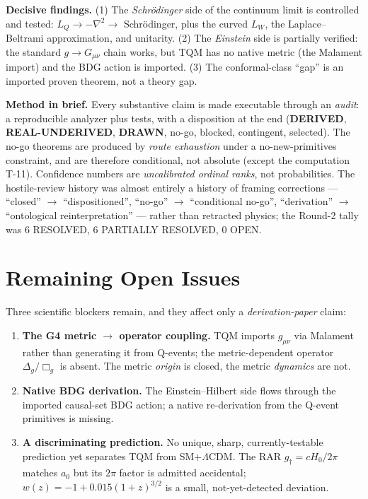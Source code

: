 \documentclass[10pt,a4paper]{article}
\newcommand{\derived}{\textbf{DERIVED}}
\newcommand{\realunder}{\textbf{REAL-UNDERIVED}}
\newcommand{\drawn}{\textbf{DRAWN}}
\begin{document}
\textbf{Decisive findings.} (1) The \emph{Schr\"odinger} side of the continuum limit is
controlled and tested: $L_Q\to-\nabla^2\to$ Schr\"odinger, plus the curved $L_W$, the
Laplace--Beltrami approximation, and unitarity. (2) The \emph{Einstein} side is partially
verified: the standard $g\to G_{\mu\nu}$ chain works, but TQM has no native metric (the
Malament import) and the BDG action is imported. (3) The conformal-class ``gap'' is an
imported proven theorem, not a theory gap.

\textbf{Method in brief.} Every substantive claim is made executable through an
\emph{audit}: a reproducible analyzer plus tests, with a disposition at the end
(\derived, \realunder, \drawn, no-go, blocked, contingent, selected). The no-go theorems
are produced by \emph{route exhaustion} under a no-new-primitives constraint, and are
therefore conditional, not absolute (except the computation T-11). Confidence numbers are
\emph{uncalibrated ordinal ranks}, not probabilities. The hostile-review history was almost
entirely a history of framing corrections --- ``closed'' $\to$ ``dispositioned'',
``no-go'' $\to$ ``conditional no-go'', ``derivation'' $\to$ ``ontological
reinterpretation'' --- rather than retracted physics; the Round-2 tally was 6 RESOLVED,
6 PARTIALLY RESOLVED, 0 OPEN.

\section{Remaining Open Issues}

Three scientific blockers remain, and they affect only a \emph{derivation-paper} claim:

\begin{enumerate}
\item \textbf{The G4 metric $\to$ operator coupling.} TQM imports $g_{\mu\nu}$ via
Malament rather than generating it from Q-events; the metric-dependent operator
$\Delta_g/\Box_g$ is absent. The metric \emph{origin} is closed, the metric
\emph{dynamics} are not.
\item \textbf{Native BDG derivation.} The Einstein--Hilbert side flows through the
imported causal-set BDG action; a native re-derivation from the Q-event primitives is
missing.
\item \textbf{A discriminating prediction.} No unique, sharp, currently-testable prediction
yet separates TQM from SM$+\Lambda$CDM. The RAR $g_\dagger=cH_0/2\pi$ matches $a_0$ but its
$2\pi$ factor is admitted accidental; $w(z)=-1+0.015(1+z)^{3/2}$ is a small, not-yet-detected
deviation.
\end{enumerate}
\end{document}
